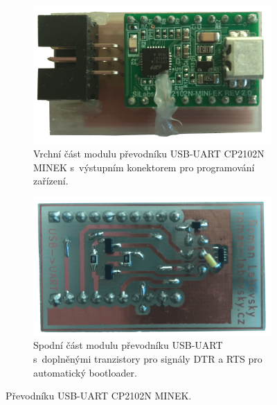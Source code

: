 


\begin{figure}[H]
\centering
\begin{subfigure}{.5\textwidth}
    \centering
    \includegraphics[width=\textwidth]{images/prevodnik-usb-uart-cp2102n/prevodnik-cp2102n-modul-vrchni-cast.png}
    \caption[Vrchní část modulu převodníku USB-UART.]{Vrchní část modulu převodníku USB-UART CP2102N MINEK s~výstupním konektorem pro programování zařízení.}
    \label{fig:prevodnik-cp2102n-modul-vrchni-cast}
\end{subfigure}%
\begin{subfigure}{.5\textwidth}
    \centering
    \includegraphics[width=\textwidth]{images/prevodnik-usb-uart-cp2102n/prevodnik-cp2102n-modul-spodni-cast.png}
    \caption[Spodní část modulu převodníku USB-UART.]{Spodní část modulu převodníku USB-UART s~doplněnými tranzistory pro signály DTR a RTS pro automatický bootloader.}
    \label{fig:prevodnik-cp2102n-modul-spodni-cast}
\end{subfigure}
\caption{Převodníku USB-UART CP2102N MINEK.}
\label{fig:prevodnik-cp2102n}
\end{figure}